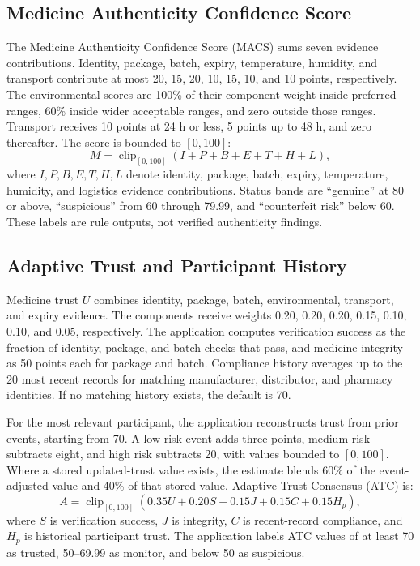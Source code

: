 \documentclass[conference]{IEEEtran}
\begin{document}
\subsection{Medicine Authenticity Confidence Score}
The Medicine Authenticity Confidence Score (MACS) sums seven evidence contributions. Identity, package, batch, expiry, temperature, humidity, and transport contribute at most 20, 15, 20, 10, 15, 10, and 10 points, respectively. The environmental scores are 100\% of their component weight inside preferred ranges, 60\% inside wider acceptable ranges, and zero outside those ranges. Transport receives 10 points at 24 h or less, 5 points up to 48 h, and zero thereafter. The score is bounded to $[0,100]$:
\begin{equation}
 M=\operatorname{clip}_{[0,100]}(I+P+B+E+T+H+L),
 \label{eq:macs}
\end{equation}
where $I,P,B,E,T,H,L$ denote identity, package, batch, expiry, temperature, humidity, and logistics evidence contributions. Status bands are “genuine” at 80 or above, “suspicious” from 60 through 79.99, and “counterfeit risk” below 60. These labels are rule outputs, not verified authenticity findings.

\subsection{Adaptive Trust and Participant History}
Medicine trust $U$ combines identity, package, batch, environmental, transport, and expiry evidence. The components receive weights 0.20, 0.20, 0.20, 0.15, 0.10, 0.10, and 0.05, respectively. The application computes verification success as the fraction of identity, package, and batch checks that pass, and medicine integrity as 50 points each for package and batch. Compliance history averages up to the 20 most recent records for matching manufacturer, distributor, and pharmacy identities. If no matching history exists, the default is 70.

For the most relevant participant, the application reconstructs trust from prior events, starting from 70. A low-risk event adds three points, medium risk subtracts eight, and high risk subtracts 20, with values bounded to $[0,100]$. Where a stored updated-trust value exists, the estimate blends 60\% of the event-adjusted value and 40\% of that stored value. Adaptive Trust Consensus (ATC) is:
\begin{equation}
 A=\operatorname{clip}_{[0,100]}(0.35U+0.20S+0.15J+0.15C+0.15H_p),
 \label{eq:atc}
\end{equation}
where $S$ is verification success, $J$ is integrity, $C$ is recent-record compliance, and $H_p$ is historical participant trust. The application labels ATC values of at least 70 as trusted, 50--69.99 as monitor, and below 50 as suspicious.
\end{document}
